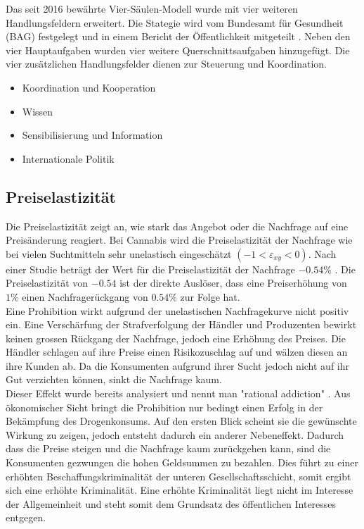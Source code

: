 \documentclass[../main.tex]{subfiles}
\begin{document}
    
    
	\noindent
	Das seit 2016 bewährte Vier-Säulen-Modell wurde mit vier weiteren Handlungsfeldern erweitert. 
	Die Stategie wird vom Bundesamt für Gesundheit (BAG) festgelegt und in einem Bericht der Öffentlichkeit mitgeteilt \cite{bag-2015}.	
	Neben den vier Hauptaufgaben wurden vier weitere Querschnittsaufgaben hinzugefügt.
	Die vier zusätzlichen Handlungsfelder dienen zur Steuerung und Koordination.
	
	\begin{itemize}
		\item Koordination und Kooperation
		\item Wissen
		\item Sensibilisierung und Information
		\item Internationale Politik
	\end{itemize}
	
	

	
	
	\subsection{Preiselastizität}
	Die Preiselastizität zeigt an, wie stark das Angebot oder die Nachfrage auf eine Preisänderung reagiert.
	Bei Cannabis wird die Preiselastizität der Nachfrage wie bei vielen Suchtmitteln sehr unelastisch eingeschätzt $(-1<\varepsilon_{xy}<0)$. 
	Nach einer Studie beträgt der Wert für die Preiselastizität der Nachfrage $-0.54\%$ \cite{golzar}.
	Die Preiselastizität von $-0.54$ ist der direkte Auslöser, dass eine Preiserhöhung von $1\%$ einen Nachfragerückgang von $0.54\%$ zur Folge hat.\\
	
	
	\noindent
	Eine Prohibition wirkt aufgrund der unelastischen Nachfragekurve nicht positiv ein.
	Eine Verschärfung der Strafverfolgung der Händler und Produzenten bewirkt keinen grossen Rückgang der Nachfrage, jedoch eine Erhöhung des Preises.
	Die Händler schlagen auf ihre Preise einen Risikozuschlag auf und wälzen diesen an ihre Kunden ab.
	Da die Konsumenten aufgrund ihrer Sucht jedoch nicht auf ihr Gut verzichten können, sinkt die Nachfrage kaum.\\
	
	\noindent
	Dieser Effekt wurde bereits analysiert und nennt man "rational addiction"  \cite{becker}.
	Aus ökonomischer Sicht bringt die Prohibition nur bedingt einen Erfolg in der Bekämpfung des Drogenkonsums. 
	Auf den ersten Blick scheint sie die gewünschte Wirkung zu zeigen, jedoch entsteht dadurch ein anderer Nebeneffekt. 
	Dadurch dass die Preise steigen und die Nachfrage kaum zurückgehen kann, sind die Konsumenten gezwungen die hohen Geldsummen zu bezahlen.
	Dies führt zu einer erhöhten Beschaffungskriminalität der unteren Gesellschaftsschicht, somit ergibt sich eine erhöhte Kriminalität. 
	Eine erhöhte Kriminalität liegt nicht im Interesse der Allgemeinheit und steht somit dem Grundsatz des öffentlichen Interesses entgegen.
	
\end{document}
